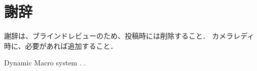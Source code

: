 \documentclass[twoside]{wiss}
\begin{document}
\section*{謝辞}

謝辞は、ブラインドレビューのため、投稿時には削除すること．
カメラレディ時に、必要があれば追加すること．

Dynamic Macro system\cite{DynamicMacro}
\cite{texteditors.org}
\cite{Kawada:WP}
\cite{Mori:WordProcessor}
\cite{Doi:STARS}
\cite{Doi:COLING98}
\cite{texteditors.org}
\cite{Li:1lineKB}\cite{MacKenzie:H4Writer}\cite{Rick:VirtualKB}
\cite{Dietz:PressureKB}\cite{Harrison:Skinput}\cite{Murase:CameraKB}\cite{Wigdor:TiltKB}
\cite{Tesler:CopyPaste}.
\cite{Masui:Goldfish}\cite{PickAndDrop}.


{\scriptsize


}







\end{document}

